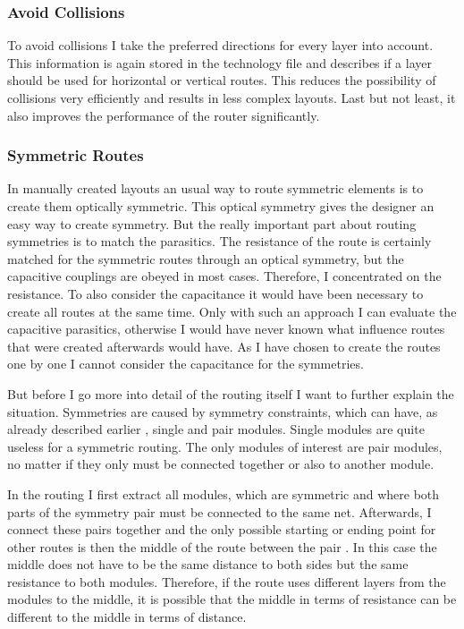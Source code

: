 \subsubsection{Avoid Collisions}
To avoid collisions I take the preferred directions for every layer into account. This information is again stored in the technology file and describes if a layer should be used for horizontal or vertical routes. This reduces the possibility of collisions very efficiently and results in less complex layouts. Last but not least, it also improves the performance of the router significantly.

\subsubsection{Symmetric Routes}
In manually created layouts an usual way to route symmetric elements is to create them optically symmetric. This optical symmetry gives the designer an easy way to create symmetry. But the really important part about routing symmetries is to match the parasitics. The resistance of the route is certainly matched for the symmetric routes through an optical symmetry, but the capacitive couplings are obeyed in most cases. Therefore, I concentrated on the resistance. To also consider the capacitance it would have been necessary to create all routes at the same time. Only with such an approach I can evaluate the capacitive parasitics, otherwise I would have never known what influence routes that were created afterwards would have. As I have chosen to create the routes one by one I cannot consider the capacitance for the symmetries.

But before I go more into detail of the routing itself I want to further explain the situation. Symmetries are caused by symmetry constraints, which can have, as already described earlier , single and pair modules. Single modules are quite useless for a symmetric routing. The only modules of interest are pair modules, no matter if they only must be connected together or also to another module.

In the routing I first extract all modules, which are symmetric and where both parts of the symmetry pair must be connected to the same net. Afterwards, I connect these pairs together and the only possible starting or ending point for other routes is then the middle of the route between the pair . In this case the middle does not have to be the same distance to both sides but the same resistance to both modules. Therefore, if the route uses different layers from the modules to the middle, it is possible that the middle in terms of resistance can be different to the middle in terms of distance.

